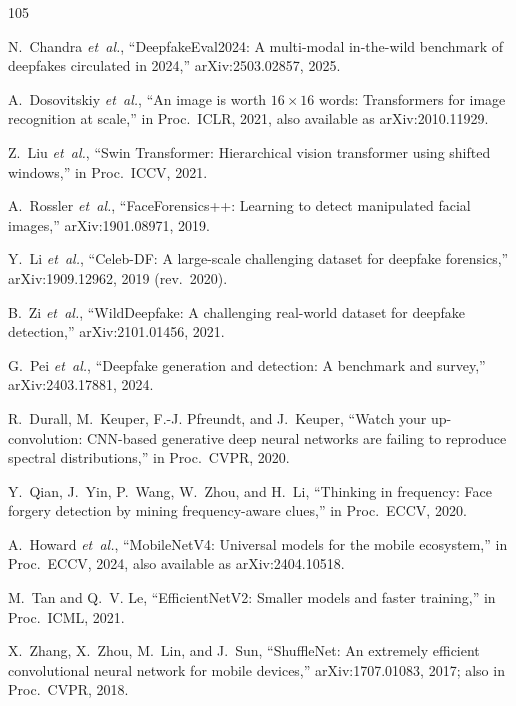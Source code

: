 \begin{thebibliography}{105}

N.~Chandra \emph{et~al.}, ``DeepfakeEval2024: A multi-modal in-the-wild benchmark of deepfakes circulated in 2024,'' arXiv:2503.02857, 2025.

A.~Dosovitskiy \emph{et~al.}, ``An image is worth $16{\times}16$ words: Transformers for image recognition at scale,'' in Proc.\ ICLR, 2021, also available as arXiv:2010.11929.

Z.~Liu \emph{et~al.}, ``Swin Transformer: Hierarchical vision transformer using shifted windows,'' in Proc.\ ICCV, 2021.

A.~Rossler \emph{et~al.}, ``FaceForensics++: Learning to detect manipulated facial images,'' arXiv:1901.08971, 2019.

Y.~Li \emph{et~al.}, ``Celeb-DF: A large-scale challenging dataset for deepfake forensics,'' arXiv:1909.12962, 2019 (rev.\ 2020).

B.~Zi \emph{et~al.}, ``WildDeepfake: A challenging real-world dataset for deepfake detection,'' arXiv:2101.01456, 2021.

G.~Pei \emph{et~al.}, ``Deepfake generation and detection: A benchmark and survey,'' arXiv:2403.17881, 2024.

R.~Durall, M.~Keuper, F.-J. Pfreundt, and J.~Keuper, ``Watch your up-convolution: CNN-based generative deep neural networks are failing to reproduce spectral distributions,'' in Proc.\ CVPR, 2020.

Y.~Qian, J.~Yin, P.~Wang, W.~Zhou, and H.~Li, ``Thinking in frequency: Face forgery detection by mining frequency-aware clues,'' in Proc.\ ECCV, 2020.

A.~Howard \emph{et~al.}, ``MobileNetV4: Universal models for the mobile ecosystem,'' in Proc.\ ECCV, 2024, also available as arXiv:2404.10518.

M.~Tan and Q.~V. Le, ``EfficientNetV2: Smaller models and faster training,'' in Proc.\ ICML, 2021.

X.~Zhang, X.~Zhou, M.~Lin, and J.~Sun, ``ShuffleNet: An extremely efficient convolutional neural network for mobile devices,'' arXiv:1707.01083, 2017; also in Proc.\ CVPR, 2018.


\end{thebibliography}
